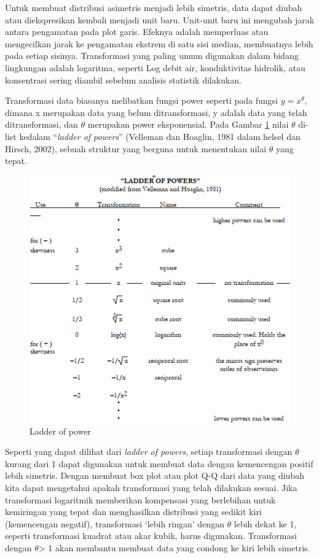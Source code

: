 \documentclass[]{book}
\begin{document}
Untuk membuat distribusi asimetris menjadi lebih simetris, data dapat
diubah atau diekspresikan kembali menjadi unit baru. Unit-unit baru ini
mengubah jarak antara pengamatan pada plot garis. Efeknya adalah
memperluas atau mengecilkan jarak ke pengamatan ekstrem di satu sisi
median, membuatnya lebih pada setiap sisinya. Transformasi yang paling
umum digunakan dalam bidang lingkungan adalah logaritma, seperti Log
debit air, konduktivitas hidrolik, atau konsentrasi sering diambil
sebelum analisis statistik dilakukan.

Transformasi data biasanya melibatkan fungsi power seperti pada fungsi
\(y=x^\theta\), dimana x merupakan data yang belum ditransformasi, y
adalah data yang telah ditransformasi, dan \(\theta\) merupakan power
eksponensial. Pada Gambar \ref{fig:power} nilai \(\theta\) di-list
kedalam ``\emph{ladder of powers}'' (Velleman dan Hoaglin, 1981 dalam
helsel dan Hirsch, 2002), sebuah struktur yang berguna untuk menentukan
nilai \(\theta\) yang tepat.

\begin{figure}

{\centering \includegraphics[width=0.7\linewidth]{ladder} 

}

\caption{Ladder of power}\label{fig:power}
\end{figure}

Seperti yang dapat dilihat dari \emph{ladder of powers}, setiap
transformasi dengan \(\theta\) kurang dari 1 dapat digunakan untuk
membuat data dengan kemencengan positif lebih simetris. Dengan membuat
box plot atau plot Q-Q dari data yang diubah kita dapat mengetahui
apakah transformasi yang telah dilakukan sesuai. Jika transformasi
logaritmik memberikan kompensasi yang berlebihan untuk kemiringan yang
tepat dan menghasilkan distribusi yang sedikit kiri (kemencengan
negatif), transformasi `lebih ringan' dengan \(\theta\) lebih dekat ke
1, seperti transformasi kuadrat atau akar kubik, harus digunakan.
Transformasi dengan \(\theta\)\textgreater{} 1 akan membantu membuat
data yang condong ke kiri lebih simetris.
\end{document}
